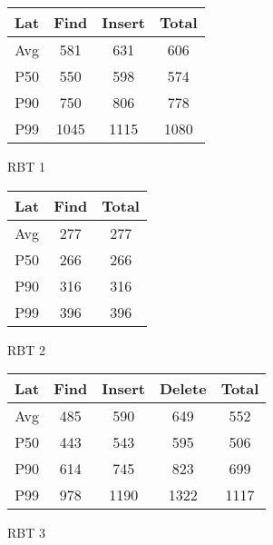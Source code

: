 \documentclass[]{article}
\begin{document}
\begin{figure}[H]
    \centering
    \begin{minipage}{0.33\textwidth}
        \centering
            \begin{tabular}{|c|ccc|}
            \hline
                Lat &  Find  & Insert & Total  \\ \hline
                Avg & 581  & 631  & 606   \\ 
                P50 & 550  & 598  & 574   \\ 
                P90 & 750  & 806  & 778   \\ 
                P99 & 1045  & 1115  & 1080   \\ \hline
            \end{tabular}
        \caption{RBT 1}
    \end{minipage}
    \begin{minipage}{0.26\textwidth}
        \centering
            \begin{tabular}{|c|cc|}
            \hline
                Lat &  Find  & Total  \\ \hline
                Avg & 277 & 277  \\ 
                P50 & 266 & 266  \\ 
                P90 & 316 & 316  \\ 
                P99 & 396 & 396  \\ \hline
            \end{tabular}
        \caption{RBT 2}
    \end{minipage}
    \begin{minipage}{0.35\textwidth}
        \centering
            \begin{tabular}{|c|cccc|}
            \hline
                Lat &  Find  & Insert & Delete & Total  \\ \hline
                Avg & 485  & 590  & 649  & 552   \\ 
                P50 & 443  & 543  & 595  & 506   \\ 
                P90 & 614  & 745  & 823  & 699   \\ 
                P99 & 978  & 1190  & 1322  & 1117   \\ \hline
            \end{tabular}
        \caption{RBT 3}
    \end{minipage}
\end{figure}
\end{document}
